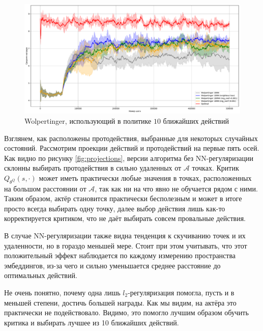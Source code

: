 \documentclass[a4paper, 12pt]{article}
\begin{document}
\begin{figure}[H]
	\captionsetup{font=scriptsize}
	\centering
    		\includegraphics[width=1.0\textwidth]{pics/10NN.pdf}
   \captionsetup{justification=centering}
   \caption{Wolpertinger, использующий в политике $10$ ближайших действий}
   \label{fig:10NN}
\end{figure}

Взглянем, как расположены протодействия, выбранные для некоторых случайных состояний. Рассмотрим проекции действий и протодействий на первые пять осей.
Как видно по рисунку \ref{fig:projections}, версии алгоритма без NN-регуляризации склонны выбирать протодействия в сильно удаленных от $\mathcal{A}$ точках. Критик $Q_{\theta^Q}(s, \cdot)$ может иметь практически любые значения в точках, расположенных на большом расстоянии от $\mathcal{A}$, так как ни на что явно не обучается рядом с ними. Таким образом, актёр становится практически бесполезным и может в итоге просто всегда выбирать одну точку, далее выбор действия лишь как-то корректируется критиком, что не даёт выбирать совсем провальные действия.

В случае NN-регуляризации также видна тенденция к скучиванию точек и их удаленности, но в гораздо меньшей мере. Стоит при этом учитывать, что этот положительный эффект наблюдается по каждому измерению пространства эмбеддингов, из-за чего и сильно уменьшается среднее расстояние до оптимальных действий.

Не очень понятно, почему одна лишь $l_2$-регуляризация помогла, пусть и в меньшей степени, достичь большей награды. Как мы видим, на актёра это практически не подействовало. Видимо, это помогло лучшим образом обучить критика и выбирать лучшее из 10 ближайших действий.
\end{document}
